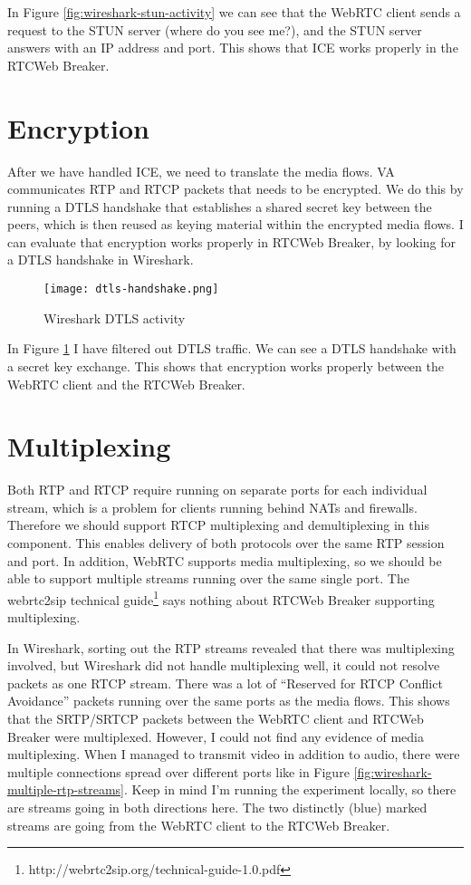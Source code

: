In Figure \ref{fig:wireshark-stun-activity} we can see that the WebRTC client sends a request to the STUN server (where do you see me?), and the STUN server answers with an IP address and port. This shows that ICE works properly in the RTCWeb Breaker.

\section{Encryption}
After we have handled ICE, we need to translate the media flows. VA communicates RTP and RTCP packets that needs to be encrypted. We do this by running a DTLS handshake that establishes a shared secret key between the peers, which is then reused as keying material within the encrypted media flows. I can evaluate that encryption works properly in RTCWeb Breaker, by looking for a DTLS handshake in Wireshark.

\begin{figure}[here]
\centerline{\texttt{[image: dtls-handshake.png]}}
\caption{Wireshark DTLS activity}
\label{fig:wireshark-dtls-handshake}
\end{figure}

In Figure \ref{fig:wireshark-dtls-handshake} I have filtered out DTLS traffic. We can see a DTLS handshake with a secret key exchange. This shows that encryption works properly between the WebRTC client and the RTCWeb Breaker.

\section{Multiplexing}
Both RTP and RTCP require running on separate ports for each individual stream, which is a problem for clients running behind NATs and firewalls. Therefore we should support RTCP multiplexing and demultiplexing in this component. This enables delivery of both protocols over the same RTP session and port. In addition, WebRTC supports media multiplexing, so we should be able to support multiple streams running over the same single port. The webrtc2sip technical guide\footnote{http://webrtc2sip.org/technical-guide-1.0.pdf} says nothing about RTCWeb Breaker supporting multiplexing.

In Wireshark, sorting out the RTP streams revealed that there was multiplexing involved, but Wireshark did not handle multiplexing well, it could not resolve packets as one RTCP stream. There was a lot of ``Reserved for RTCP Conflict Avoidance'' packets running over the same ports as the media flows. This shows that the SRTP/SRTCP packets between the WebRTC client and RTCWeb Breaker were multiplexed. However, I could not find any evidence of media multiplexing. When I managed to transmit video in addition to audio, there were multiple connections spread over different ports like in Figure \ref{fig:wireshark-multiple-rtp-streams}. Keep in mind I'm running the experiment locally, so there are streams going in both directions here. The two distinctly (blue) marked streams are going from the WebRTC client to the RTCWeb Breaker.

